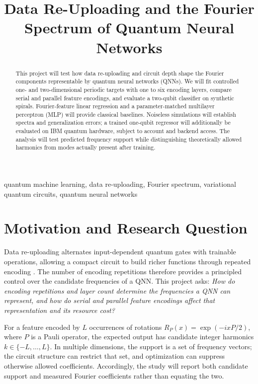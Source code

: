 \documentclass[conference]{IEEEtran}
\title{Data Re-Uploading and the Fourier Spectrum of Quantum Neural Networks}
\author{\IEEEauthorblockN{Rana Muhammad Hamza}
\IEEEauthorblockA{Roll Number: 25280103\\
QML Course\\
Instructor: Dr.\ Faryad}}
\begin{document}
\maketitle

\begin{abstract}
This project will test how data re-uploading and circuit depth shape the
Fourier components representable by quantum neural networks (QNNs). We will
fit controlled one- and two-dimensional periodic targets with one to six
encoding layers, compare serial and parallel feature encodings, and evaluate
a two-qubit classifier on synthetic spirals. Fourier-feature linear
regression and a parameter-matched multilayer perceptron (MLP) will provide
classical baselines. Noiseless simulations will establish spectra and
generalization errors; a trained one-qubit regressor will additionally be
evaluated on IBM quantum hardware, subject to account and backend access.
The analysis will test predicted frequency support while distinguishing
theoretically allowed harmonics from modes actually present after training.
\end{abstract}

\begin{IEEEkeywords}
quantum machine learning, data re-uploading, Fourier spectrum, variational
quantum circuits, quantum neural networks
\end{IEEEkeywords}

\section{Motivation and Research Question}
Data re-uploading alternates input-dependent quantum gates with trainable
operations, allowing a compact circuit to build richer functions through
repeated encoding \cite{perez,schuld}. The number of encoding repetitions
therefore provides a principled control over the candidate frequencies of a
QNN. This project asks: \emph{How do encoding repetitions and layer count
determine the frequencies a QNN can represent, and how do serial and parallel
feature encodings affect that representation and its resource cost?}

For a feature encoded by $L$ occurrences of rotations
$R_P(x)=\exp(-ixP/2)$, where $P$ is a Pauli operator, the expected output has
candidate integer harmonics $k\in\{-L,\ldots,L\}$. In multiple dimensions,
the support is a set of frequency vectors; the circuit structure can restrict
that set, and optimization can suppress otherwise allowed coefficients.
Accordingly, the study will report both candidate support and measured
Fourier coefficients rather than equating the two.
\end{document}

